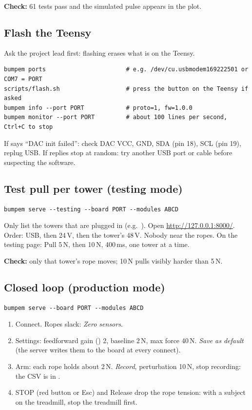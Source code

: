 \textbf{Check:} 61 tests pass and the simulated pulse appears in the plot.

\subsection{Flash the Teensy}
Ask the project lead first: flashing erases what is on the Teensy.
\begin{lstlisting}
bumpem ports                       # e.g. /dev/cu.usbmodem169222501 or COM7 = PORT
scripts/flash.sh                   # press the button on the Teensy if asked
bumpem info --port PORT            # proto=1, fw=1.0.0
bumpem monitor --port PORT         # about 100 lines per second, Ctrl+C to stop
\end{lstlisting}
If  says ``DAC init failed'': check DAC VCC, GND, SDA (pin 18), SCL (pin 19), replug USB. If
replies stop at random: try another USB port or cable before suspecting the software.

\subsection{Test pull per tower (testing mode)}
\begin{lstlisting}
bumpem serve --testing --board PORT --modules ABCD
\end{lstlisting}
Only list the towers that are plugged in (e.g.\ ). Open \url{http://127.0.0.1:8000/}.
Order: USB, then 24\,V, then the tower's 48\,V. Nobody near the ropes. On the testing page: Pull 5\,N, then
10\,N, 400\,ms, one tower at a time.

\textbf{Check:} only that tower's rope moves; 10\,N pulls visibly harder than 5\,N.

\subsection{Closed loop (production mode)}
\begin{lstlisting}
bumpem serve --board PORT --modules ABCD
\end{lstlisting}
\begin{enumerate}
\item Connect. Ropes slack: \emph{Zero sensors}.
\item Settings: feedforward gain () 2, baseline 2\,N, max force 40\,N. \emph{Save as default}
(the server writes them to the board at every connect).
\item Arm: each rope holds about 2\,N. \emph{Record}, perturbation 10\,N, stop recording: the CSV is in
.
\item STOP (red button or Esc) and Release drop the rope tension: with a subject on the treadmill, stop the
treadmill first.
\end{enumerate}

